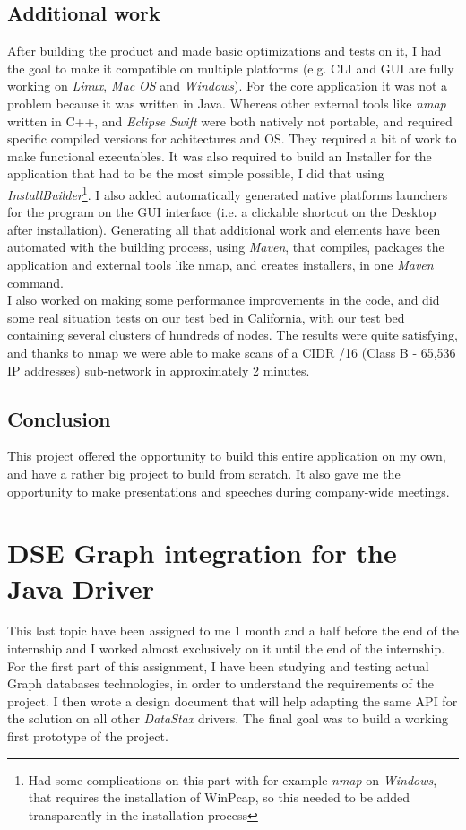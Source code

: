 \documentclass[a4paper]{report}
\newcommand{\ds}{\emph{DataStax\xspace}}
\begin{document}
\section{Additional work}
After building the product and made basic optimizations and tests on it, I had the goal to make it compatible on multiple platforms (e.g. CLI and GUI are fully working on \emph{Linux}, \emph{Mac OS} and \emph{Windows}). For the core application it was not a problem because it was written in Java. Whereas other external tools like \emph{nmap} written in C++, and \emph{Eclipse Swift} were both natively not portable, and required specific compiled versions for achitectures and OS. They required a bit of work to make functional executables. It was also required to build an Installer for the application that had to be the most simple possible, I did that using \emph{InstallBuilder}\footnote{Had some complications on this part with for example \emph{nmap} on \emph{Windows}, that requires the installation of WinPcap, so this needed to be added transparently in the installation process}. I also added automatically generated native platforms launchers for the program on the GUI interface (i.e. a clickable shortcut on the Desktop after installation). Generating all that additional work and elements have been automated with the building process, using \emph{Maven}, that compiles, packages the application and external tools like nmap, and creates installers, in one \emph{Maven} command.\\
I also worked on making some performance improvements in the code, and did some real situation tests on our test bed in California, with our test bed containing several clusters of hundreds of nodes. The results were quite satisfying, and thanks to nmap we were able to make scans of a CIDR /16 (Class B - 65,536 IP addresses) sub-network in approximately 2 minutes.

\section{Conclusion}
This project offered the opportunity to build this entire application on my own, and have a rather big project to build from scratch. It also gave me the opportunity to make presentations and speeches during company-wide meetings.


\chapter{DSE Graph integration for the Java Driver}
This last topic have been assigned to me 1 month and a half before the end of the internship and I worked almost exclusively on it until the end of the internship.\\
For the first part of this assignment, I have been studying and testing actual Graph databases technologies, in order to understand the requirements of the project. I then wrote a design document that will help adapting the same API for the solution on all other \ds{} drivers. The final goal was to build a working first prototype of the project.
\end{document}
